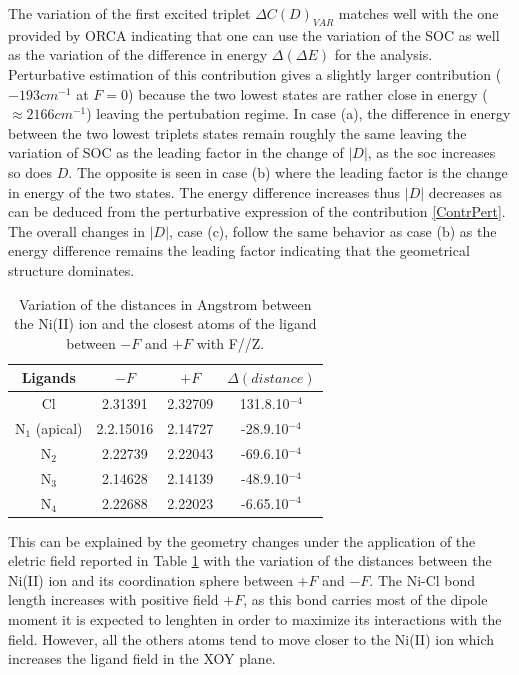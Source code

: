 \documentclass[10pt]{report}
\numberwithin{equation}{section}
\begin{document}
The variation of the first excited triplet $\Delta C(D)_{VAR}$ matches well with the one provided by ORCA indicating that one can use the variation of the SOC as well as the variation of the difference in energy $\Delta (\Delta E)$ for the analysis.
Perturbative estimation of this contribution gives a slightly larger contribution ($-193 cm^{-1}$ at $F=0$) because the two lowest states are rather close in energy ($\approx 2166 cm^{-1}$) leaving the pertubation regime.
In case (a), the difference in energy between the two lowest triplets states remain roughly the same leaving the variation of SOC as the leading factor in the change of $|D|$, as the soc increases so does $D$.
The opposite is seen in case (b) where the leading factor is the change in energy of the two states. 
The energy difference increases thus $|D|$ decreases as can be deduced from the perturbative expression of the contribution \ref{ContrPert}.
The overall changes in $|D|$, case (c), follow the same behavior as case (b) as the energy difference remains the leading factor indicating that the geometrical structure dominates.
\begin{table}[h!]
    \centering
    \begin{tabular}{| c | c| c | c |}
        \hline
        Ligands & $-F$ & $+F$ &$\Delta(distance)$\\
        \hline
        Cl & 2.31391& 2.32709&  131.8.10$^{-4}$\\
        N$_1$ (apical) & 2.2.15016  & 2.14727 &-28.9.10$^{-4}$\\
        N$_2$ & 2.22739 & 2.22043&-69.6.10$^{-4}$ \\
        N$_3$ & 2.14628& 2.14139&-48.9.10$^{-4}$ \\
        N$_4$ & 2.22688 & 2.22023 &-6.65.10$^{-4}$\\
        \hline
    \end{tabular}
    \caption{Variation of the distances in Angstrom between the Ni(II) ion and the closest atoms of the ligand between $-F$ and $+F$ with F//Z.}
    \label{tab:DistanceZ}
\end{table}
This can be explained by the geometry changes under the application of the eletric field reported in Table \ref{tab:DistanceZ} with the variation of the distances between the Ni(II) ion and its coordination sphere between $+F$ and $-F$.
The Ni-Cl bond length increases with positive field $+F$, as this bond carries most of the dipole moment it is expected to lenghten in order to maximize its interactions with the field. 
However, all the others atoms tend to move closer to the Ni(II) ion which increases the ligand field in the XOY plane. 
\end{document}

